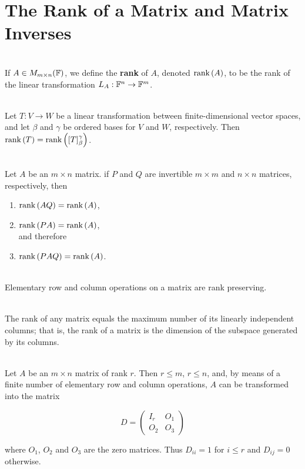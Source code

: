 \section{The Rank of a Matrix and Matrix Inverses}

\begin{definition}
	\hfill\\
	If $A \in M_{m \times n}(\mathbb{F})$, we define the \textbf{rank} of $A$, denoted $\text{rank}\left(A\right)$, to be the rank of the linear transformation $L_A: \mathbb{F}^n \to \mathbb{F}^m$.
\end{definition}

\begin{theorem}
	\hfill\\
	Let $T: V \to W$ be a linear transformation between finite-dimensional vector spaces, and let $\beta$ and $\gamma$ be ordered bases for $V$ and $W$, respectively. Then $\text{rank}\left(T\right) = \text{rank}\left([T]_\beta^\gamma\right)$.
\end{theorem}

\begin{theorem}
	\hfill\\
	Let $A$ be an $m \times n$ matrix. if $P$ and $Q$ are invertible $m \times m$ and $n \times n$ matrices, respectively, then

	\begin{enumerate}
		\item $\text{rank}\left(AQ\right) = \text{rank}\left(A\right)$,
		\item $\text{rank}\left(PA\right) = \text{rank}\left(A\right)$,\\ and therefore
		\item $\text{rank}\left(PAQ\right) = \text{rank}\left(A\right)$.
	\end{enumerate}
\end{theorem}

\begin{corollary}
	\hfill\\
	Elementary row and column operations on a matrix are rank preserving.
\end{corollary}

\begin{theorem}
	\hfill\\
	The rank of any matrix equals the maximum number of its linearly independent columns; that is, the rank of a matrix is the dimension of the subspace generated by its columns.
\end{theorem}

\begin{theorem}
	\hfill\\
	Let $A$ be an $m \times n$ matrix of rank $r$. Then $r \leq m$, $r \leq n$, and, by means of a finite number of elementary row and column operations, $A$ can be transformed into the matrix

	\[D = \begin{pmatrix}
			I_r & O_1 \\
			O_2 & O_3
		\end{pmatrix}\]

	where $O_1$, $O_2$ and $O_3$ are the zero matrices. Thus $D_{ii} = 1$ for $i \leq r$ and $D_{ij} = 0$ otherwise.
\end{theorem}


